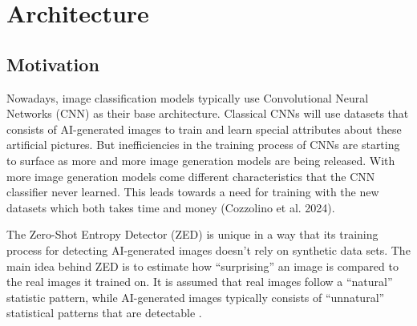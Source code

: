 \documentclass{article} %
\begin{document}
\section{Architecture}
\label{arch}
\subsection{Motivation}

Nowadays, image classification models typically use Convolutional Neural Networks (CNN) as their base architecture. Classical CNNs will use datasets that consists of AI-generated images to train and learn special attributes about these artificial pictures. But inefficiencies in the training process of CNNs are starting to surface as more and more image generation models are being released. With more image generation models come different characteristics that the CNN classifier never learned. This leads towards a need for training with the new datasets which both takes time and money (Cozzolino et al. 2024).


The Zero-Shot Entropy Detector (ZED) is unique in a way that its training process for detecting AI-generated images doesn't rely on synthetic data sets. The main idea behind ZED is to estimate how ``surprising'' an image is compared to the real images it trained on. It is assumed that real images follow a ``natural'' statistic pattern, while AI-generated images typically consists of ``unnatural'' statistical patterns that are detectable \citep{cozzolino2024zeroshotdetectionaigeneratedimages}.

\end{document}
